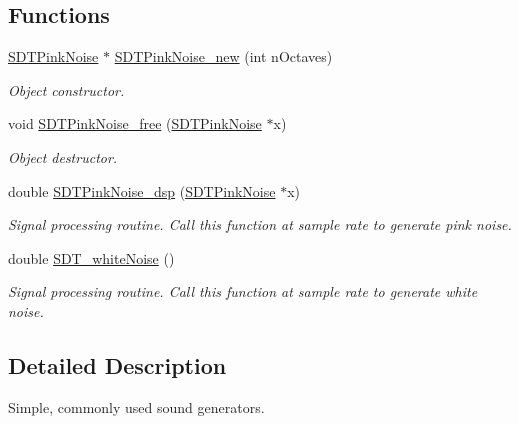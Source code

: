 \subsection*{Functions}
\begin{DoxyCompactItemize}
\item 
\hyperlink{group__oscillators_gac933fcdadc8959769a466840604f8f6c}{S\+D\+T\+Pink\+Noise} $\ast$ \hyperlink{group__oscillators_gad8d0978883d1803dc1990bd10984f8e0}{S\+D\+T\+Pink\+Noise\+\_\+new} (int n\+Octaves)
\begin{DoxyCompactList}\small\item\em Object constructor. \end{DoxyCompactList}\item 
void \hyperlink{group__oscillators_ga55abe80084a29281f67492a6aa231983}{S\+D\+T\+Pink\+Noise\+\_\+free} (\hyperlink{group__oscillators_gac933fcdadc8959769a466840604f8f6c}{S\+D\+T\+Pink\+Noise} $\ast$x)
\begin{DoxyCompactList}\small\item\em Object destructor. \end{DoxyCompactList}\item 
\hypertarget{group__oscillators_ga39efe508a6e97453dc8577e6f4e21035}{}double \hyperlink{group__oscillators_ga39efe508a6e97453dc8577e6f4e21035}{S\+D\+T\+Pink\+Noise\+\_\+dsp} (\hyperlink{group__oscillators_gac933fcdadc8959769a466840604f8f6c}{S\+D\+T\+Pink\+Noise} $\ast$x)\label{group__oscillators_ga39efe508a6e97453dc8577e6f4e21035}

\begin{DoxyCompactList}\small\item\em Signal processing routine. Call this function at sample rate to generate pink noise. \end{DoxyCompactList}\item 
\hypertarget{group__oscillators_ga442d1292dbae9332064f427ee40c15d4}{}double \hyperlink{group__oscillators_ga442d1292dbae9332064f427ee40c15d4}{S\+D\+T\+\_\+white\+Noise} ()\label{group__oscillators_ga442d1292dbae9332064f427ee40c15d4}

\begin{DoxyCompactList}\small\item\em Signal processing routine. Call this function at sample rate to generate white noise. \end{DoxyCompactList}\end{DoxyCompactItemize}


\subsection{Detailed Description}
Simple, commonly used sound generators. 

